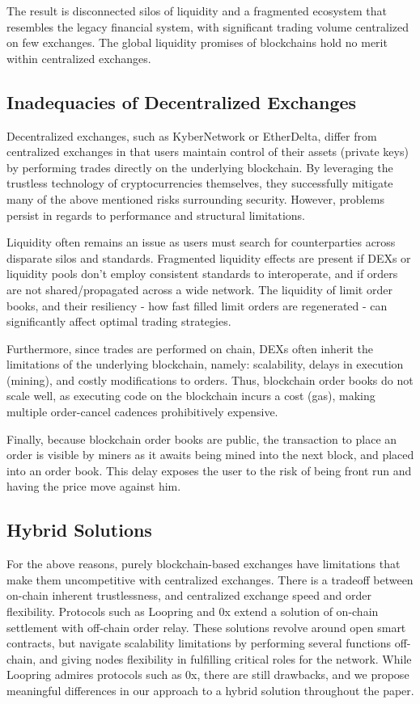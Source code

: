 \documentclass[UTF8,nofonts]{article}
\begin{document}
The result is disconnected silos of liquidity and a fragmented ecosystem that resembles the legacy financial system, with significant trading volume centralized on few exchanges. The global liquidity promises of blockchains hold no merit within centralized exchanges.

\subsection{Inadequacies of Decentralized Exchanges}
Decentralized exchanges, such as KyberNetwork or EtherDelta, differ from centralized exchanges in that users maintain control of their assets (private keys) by performing trades directly on the underlying blockchain. By leveraging the trustless technology of cryptocurrencies themselves, they successfully mitigate many of the above mentioned risks surrounding security. However, problems persist in regards to performance and structural limitations. 

Liquidity often remains an issue as users must search for counterparties across disparate silos and standards. Fragmented liquidity effects are present if DEXs or liquidity pools don't employ consistent standards to interoperate, and if orders are not shared/propagated across a wide network. The liquidity of limit order books, and their resiliency - how fast filled limit orders are regenerated - can significantly affect optimal trading strategies.

Furthermore, since trades are performed on chain, DEXs often inherit the limitations of the underlying blockchain, namely: scalability, delays in execution (mining), and costly modifications to orders. Thus, blockchain order books do not scale well, as executing code on the blockchain incurs a cost (gas), making multiple order-cancel cadences prohibitively expensive. 

Finally, because blockchain order books are public, the transaction to place an order is visible by miners as it awaits being mined into the next block, and placed into an order book. This delay exposes the user to the risk of being front run and having the price move against him.

\subsection{Hybrid Solutions}
For the above reasons, purely blockchain-based exchanges have limitations that make them uncompetitive with centralized exchanges. There is a tradeoff between on-chain inherent trustlessness, and centralized exchange speed and order flexibility. Protocols such as Loopring and 0x \cite{warren20170x} extend a solution of on-chain settlement with off-chain order relay. These solutions revolve around open smart contracts, but navigate scalability limitations by performing several functions off-chain, and giving nodes flexibility in fulfilling critical roles for the network. While Loopring admires protocols such as 0x, there are still drawbacks\cite{costofdecent}, and we propose meaningful differences in our approach to a hybrid solution throughout the paper.
\end{document}
